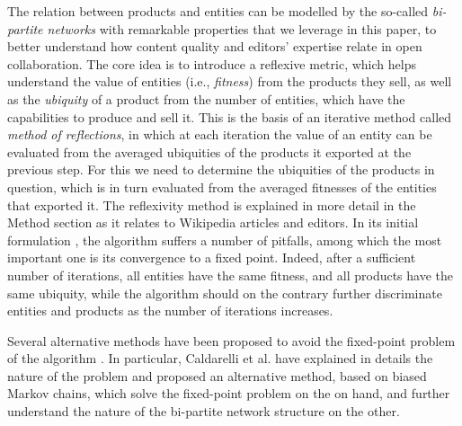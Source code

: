 The relation between products and entities can be modelled by the so-called {\it bi-partite networks} with remarkable properties \cite{hidalgo2009} that we leverage in this paper, to better understand how content quality and editors' expertise relate in open collaboration. The core idea is to introduce a reflexive metric, which helps understand the value of entities (i.e., {\it fitness}) from the products they sell, as well as the {\it ubiquity} of a product from the number of entities, which have the capabilities to produce and sell it. This is the basis of an iterative method called {\it method of reflections}, in which at each iteration the value of an entity can be evaluated from the averaged ubiquities of the products it exported at the previous step. For this we need to determine the ubiquities of the products in question, which is in turn evaluated from the averaged fitnesses of the entities that exported it. The reflexivity method is explained in more detail in the Method section as it relates to Wikipedia articles and editors. In its initial formulation \cite{hidalgo2009}, the algorithm suffers a number of pitfalls, among which the most important one is its convergence to a fixed point. Indeed, after a sufficient number of iterations, all entities have the same fitness, and all products have the same ubiquity, while the algorithm should on the contrary further discriminate entities and products as the number of iterations increases. 

Several alternative methods have been proposed to avoid the fixed-point problem of the algorithm \cite{tacchella2012new, cristelli2012competitors, tacchella2013economic, cristelli2013measuring}. In particular, Caldarelli et al. \cite{caldarelli2012network} have explained in details the nature of the problem and proposed an alternative method, based on biased Markov chains, which solve the fixed-point problem on the on hand, and further understand the nature of the bi-partite network structure on the other. 
